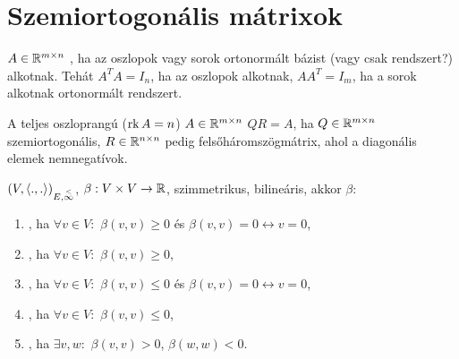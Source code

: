 \documentclass{article}
\begin{document}
\section{Szemiortogonális mátrixok}
	\begin{ff}
		$A\in\mathbb{R}^{m\times n}$ , ha az oszlopok vagy sorok ortonormált
		bázist (vagy csak rendszert?) alkotnak. Tehát $A^TA=I_n$, ha az oszlopok
		alkotnak, $AA^T=I_m$, ha a sorok alkotnak ortonormált rendszert.
	\end{ff}
	\begin{ff}
		A teljes oszloprangú ($\operatorname{rk}{A}=n$) $A\in\mathbb{R}^{m\times n}$  $QR=A$, ha
		$Q\in\mathbb{R}^{m\times n}$ szemiortogonális, $R\in\mathbb{R}^{n\times n}$ pedig felsőháromszögmátrix, ahol a
		diagonális elemek nemnegatívok.
	\end{ff}
	
	\begin{ff}
		$(V,\langle.,.\rangle)_{E,\overset{<}{\infty}}$, $\beta:V\times V\to \mathbb{R}$, szimmetrikus, bilineáris, akkor
	$\beta:$	
		\begin{enumerate}
			\item {}, ha $\forall v\in V:$ $\beta(v,v)\ge 0$ és
				$\beta(v,v)=0\leftrightarrow v=0$,
			\item {}, ha $\forall v\in V:$ $\beta(v,v)\ge 0$,
			\item {}, ha $\forall v\in V:$ $\beta(v,v)\leq 0$ és
				$\beta(v,v)=0\leftrightarrow v=0$,
			\item {}, ha $\forall v\in V:$ $\beta(v,v)\leq 0$,
			\item {}, ha $\exists v,w:$ $\beta(v,v)>0$, $\beta(w,w)<0$.
		\end{enumerate}
	\end{ff}

	
\end{document}
